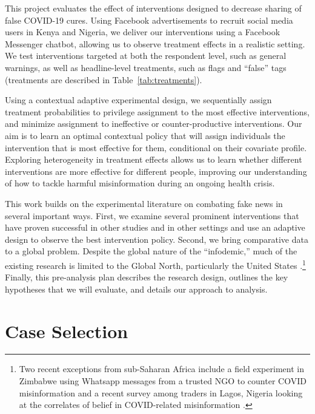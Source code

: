 \documentclass[letterpaper, 12pt, parskip=full,]{scrartcl}
\begin{document}
This project evaluates the effect of interventions designed to decrease sharing of false COVID-19 cures. Using Facebook advertisements to recruit social media users in Kenya and Nigeria, we deliver our interventions using a Facebook Messenger chatbot, allowing us to observe treatment effects in a realistic setting. We test interventions targeted at both the respondent level, such as general warnings, as well as headline-level treatments, such as flags and ``false'' tags (treatments are described in Table~\ref{tab:treatments}). 

Using a contextual adaptive experimental design, we sequentially assign treatment probabilities to privilege assignment to the most effective interventions, and minimize assignment to ineffective or counter-productive interventions. Our aim is to learn an optimal contextual policy that will assign individuals the intervention that is most effective for them, conditional on their covariate profile. Exploring heterogeneity in treatment effects allows us to learn whether different interventions are more effective for different people, improving our understanding of how to tackle harmful misinformation during an ongoing health crisis. 

This work builds on the experimental literature on combating fake news in several important ways. First, we examine several prominent interventions that have proven successful in other studies and in other settings and use an adaptive design to observe the best intervention policy. Second, we bring comparative data to a global problem. Despite the global nature of the ``infodemic,'' much of the existing research is limited to the Global North, particularly the United States \citep{pennycook2020fighting, bursztyn2020misinformation}.\footnote{Two recent exceptions from sub-Saharan Africa include a field experiment in Zimbabwe using Whatsapp messages from a trusted NGO  to counter COVID misinformation \citep{bowles2020center} and a recent survey among traders in Lagos, Nigeria looking at the correlates of belief in COVID-related misinformation \citep{Grossman2020}.} Finally, this pre-analysis plan describes the research design, outlines the key hypotheses that we will evaluate, and details our approach to analysis.




\section{Case Selection}
\end{document}
